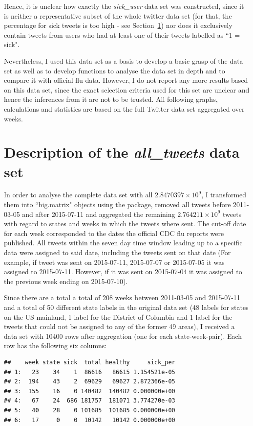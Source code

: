 \documentclass[11pt, a4paper]{report}\usepackage[]{graphicx}\usepackage[]{color}
\makeatletter
\newenvironment{kframe}{%
 \def\at@end@of@kframe{}%
 \ifinner\ifhmode%
  \def\at@end@of@kframe{\end{minipage}}%
  \begin{minipage}{\columnwidth}%
 \fi\fi%
 \def\FrameCommand##1{\hskip\@totalleftmargin \hskip-\fboxsep
 \colorbox{shadecolor}{##1}\hskip-\fboxsep
     \hskip-\linewidth \hskip-\@totalleftmargin \hskip\columnwidth}%
 \MakeFramed {\advance\hsize-\width
   \@totalleftmargin\z@ \linewidth\hsize
   \@setminipage}}%
 {\par\unskip\endMakeFramed%
 \at@end@of@kframe}
\newenvironment{knitrout}{}{} %
\makeatother
\begin{document}
Hence, it is unclear how exactly the \textit{sick\_user} data set was constructed, since it is neither a representative subset of the whole twitter data set (for that, the percentage for sick tweets is too high - see Section~\ref{sec:full_set}) nor does it exclusively contain tweets from users who had at least one of their tweets labelled as ``1 = sick".

Nevertheless, I used this data set as a basis to develop a basic grasp of the data set as well as to develop functions to analyse the data set in depth and to compare it with official flu data. However, I do not report any more results based on this data set, since the exact selection criteria used for this set are unclear and hence the inferences from it are not to be trusted. All following graphs, calculations and statistics are based on the full Twitter data set aggregated over weeks. 

\section{Description of the \textit{all\_tweets} data set}
\label{sec:full_set}

In order to analyse the complete data set with all \ensuremath{2.8470397\times 10^{9}}, I transformed them into ``big.matrix" objects using the  package, removed all tweets before 2011-03-05 and after 2015-07-11 and aggregated the remaining \ensuremath{2.764211\times 10^{9}} tweets with regard to states and weeks in which the tweets where sent. The cut-off date for each week corresponded to the dates the official CDC flu reports were published. All tweets within the seven day time window leading up to a specific data were assigned to said date, including the tweets sent on that date (For example, if tweet was sent on 2015-07-11, 2015-07-07 or 2015-07-05 it was assigned to 2015-07-11. However, if it was sent on 2015-07-04 it was assigned to the previous week ending on 2015-07-10).\newline

Since there are a total a total of 208 weeks between 2011-03-05 and 2015-07-11 and a total of 50 different state labels in the original data set (48 labels for states on the US mainland, 1 label for the District of Columbia and 1 label for the tweets that could not be assigned to any of the former 49 areas), I received a data set with 10400 rows after aggregation (one for each state-week-pair). Each row has the following six columns:

\begin{knitrout}
\color{fgcolor}\begin{kframe}
\begin{verbatim}
##    week state sick  total healthy     sick_per
## 1:   23    34    1  86616   86615 1.154521e-05
## 2:  194    43    2  69629   69627 2.872366e-05
## 3:  155    16    0 140482  140482 0.000000e+00
## 4:   67    24  686 181757  181071 3.774270e-03
## 5:   40    28    0 101685  101685 0.000000e+00
## 6:   17     0    0  10142   10142 0.000000e+00
\end{verbatim}
\end{kframe}
\end{knitrout}
\end{document}
